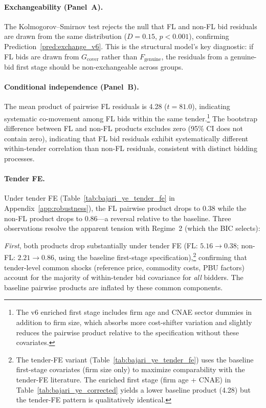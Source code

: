 

\paragraph{Exchangeability (Panel~A).}
The Kolmogorov--Smirnov test rejects the null that FL and
non-FL bid residuals are drawn from the same distribution
($D = 0.15$, $p < 0.001$), confirming
Prediction~\ref{pred:exchange_v6}. This is the structural model's
key diagnostic: if FL bids are drawn from $G_{\text{cover}}$ rather
than $F_{\text{genuine}}$, the residuals from a genuine-bid first
stage should be non-exchangeable across groups.

\paragraph{Conditional independence (Panel~B).}
The mean product of pairwise FL residuals is 4.28 ($t = 81.0$), %
indicating systematic co-movement among FL bids within the same
tender.\footnote{The v6 enriched first stage includes firm age and
CNAE sector dummies in addition to firm size, which absorbs more
cost-shifter variation and slightly reduces the pairwise product
relative to the specification without these covariates.}
The bootstrap difference between FL and non-FL products excludes zero
(95\% CI does not contain zero), indicating that FL bid residuals
exhibit systematically different within-tender correlation than non-FL
residuals, consistent with distinct bidding processes.

\paragraph{Tender FE.}
Under tender FE (Table~\ref{tab:bajari_ye_tender_fe} in
Appendix~\ref{app:robustness}), the FL pairwise product drops to
0.38 while the non-FL product drops to 0.86---a reversal relative to
the baseline. Three observations resolve the apparent tension with
Regime~2 (which the BIC selects):

\emph{First}, both products drop substantially under tender FE (FL:
$5.16 \to 0.38$; non-FL: $2.21 \to 0.86$, using the baseline
first-stage specification),\footnote{The tender-FE variant
(Table~\ref{tab:bajari_ye_tender_fe}) uses the baseline first-stage
covariates (firm size only) to maximize comparability with the
tender-FE literature. The enriched first stage (firm age + CNAE)
in Table~\ref{tab:bajari_ye_corrected} yields a lower baseline
product (4.28) but the tender-FE pattern is qualitatively identical.}
confirming that
tender-level common shocks (reference price, commodity costs, PBU
factors) account for the majority of within-tender bid covariance for
\emph{all} bidders. The baseline pairwise products are inflated by
these common components.

